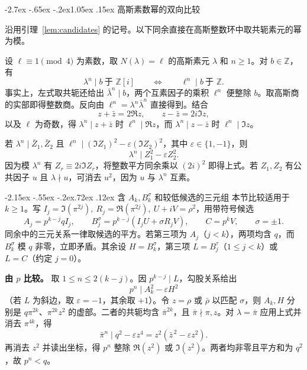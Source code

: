 \documentclass[11pt,a4paper,twoside]{article}
\makeatletter
\numberwithin{equation}{section}
\renewcommand{\section}{\@startsection{section}{1}{\z@}%
  {-2.7ex \@plus -.65ex \@minus -.2ex}{1.05ex \@plus .15ex}%
  {\normalfont\large\bfseries}}
\renewcommand{\subsection}{\@startsection{subsection}{2}{\z@}%
  {-2.15ex \@plus -.55ex \@minus -.2ex}{.72ex \@plus .12ex}%
  {\normalfont\normalsize\bfseries}}
\makeatother
\begin{document}
\section{高斯素数幂的双向比较}
\label{sec:gaussian-comparison}

沿用引理~\ref{lem:candidates} 的记号。以下同余直接在高斯整数环中取共轭素元的幂为模。

设 \(\ell\equiv1\pmod4\) 为素数，取 \(N(\lambda)=\ell\) 的高斯素元 \(\lambda\) 和 \(n\ge1\)。对 \(b\in\mathbb Z\)，有
\[
\lambda^n\mid b \ \text{于 }\mathbb Z[i]\qquad\Longleftrightarrow\qquad \ell^n\mid b \ \text{于 }\mathbb Z.
\]
事实上，左式取共轭还给出 \(\bar\lambda^n\mid b\)，两个互素因子的乘积 \(\ell^n\) 便整除 \(b\)。取高斯商的实部即得整数商。反向由 \(\ell^n=\lambda^n\bar\lambda^n\) 直接得到。结合
\[
z+\bar z=2\Re z,\qquad z-\bar z=2i\Im z,
\]
以及 \(\ell\) 为奇数，得 \(\lambda^n\mid z+\bar z\) 时 \(\ell^n\mid\Re z\)，而 \(\lambda^n\mid z-\bar z\) 时 \(\ell^n\mid\Im z\)。

若 \(\lambda^n\mid\bar Z_1,\bar Z_2\) 且 \(\ell^n\mid(\Im Z_1)^2-\varepsilon(\Im Z_2)^2\)，其中 \(\varepsilon\in\{1,-1\}\)，则
\[
\lambda^n\mid Z_1^2-\varepsilon Z_2^2.
\]
因为模 \(\lambda^n\) 有 \(Z_r\equiv 2i\Im Z_r\)，将整数平方同余乘以 \((2i)^2\) 即得上式。若 \(Z_1,Z_2\) 有公共因子 \(u\) 且 \(\lambda\nmid u\)，可消去 \(u^2\)，因为 \(u\) 与 \(\lambda^n\) 互素。

\subsection{含 \texorpdfstring{\(A_k,B_k^\sigma\)}{Aₖ,Bₖ(σ)} 和较低候选的三元组}
\label{subsec:gaussian-comparison}
本节比较适用于 \(k\ge1\)。写 \(I_j=\Im(\pi^{2j}),\ R_j=\Re(\pi^{2j}),\ U+iV=\rho^2\)，用带符号候选
\[
A_j=p^{k-j}qI_j,\qquad B_j^\sigma=p^{k-j}(I_jU+\sigma R_j V),\qquad
C=p^kV,\qquad \sigma=\pm1.
\]
同余中的三元关系一律取候选的平方。若第三项为 \(A_j\)（\(j<k\)），两项均含 \(q\)，而 \(B_k^\sigma\) 模 \(q\) 非零，立即矛盾。其余设 \(H=B_k^\sigma\)，第三项 \(L=B_j^\tau\)（\(1\le j<k\)）或 \(L=C\)（约定 \(j=0\)）。

\textbf{由 \(p\) 比较。} 取 \(1\le n\le 2(k-j)\)。因 \(p^{k-j}\mid L\)，勾股关系给出
\[
p^n\mid A_k^2-\varepsilon H^2
\]
（若 \(L\) 为斜边，取 \(\varepsilon=-1\)，其余取 \(+1\)）。令 \(z=\rho\) 或 \(\bar\rho\) 以匹配 \(\sigma\)，则 \(A_k,H\) 分别是 \(q\pi^{2k}\)、\(\pi^{2k}z^2\) 的虚部。二者的共轭均含 \(\bar\pi^{2k}\)，且 \(\bar\pi\nmid\pi,z\)。对 \(\lambda=\bar\pi\) 应用上式并消去 \(\pi^{4k}\)，得
\[
\bar\pi^n\mid q^2-\varepsilon z^4=z^2(\bar z^{\,2}-\varepsilon z^2).
\]
再消去 \(z^2\) 并读出坐标，得 \(p^n\) 整除 \(\Re(z^2)\) 或 \(\Im(z^2)\)。两者均非零且平方和为 \(q^2\)，故 \(p^n<q\)。
\end{document}
